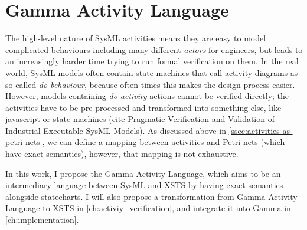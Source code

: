 \chapter{Gamma Activity Language}

The high-level nature of SysML activities means they are easy to model complicated behaviours including many different \emph{actors} for engineers, but leads to an increasingly harder time trying to run formal verification on them. In the real world, SysML models often contain state machines that call activity diagrams as so called \emph{do behaviour}, because often times this makes the design process easier. However, models containing \emph{do activity} actions cannot be verified directly; the activities have to be pre-processed and transformed into something else, like javascript or state machines (cite Pragmatic Verification and Validation of Industrial Executable SysML Models). As discussed above in \autoref{ssec:activities-as-petri-nets}, we can define a mapping between activities and Petri nets (which have exact semantics), however, that mapping is not exhaustive.

In this work, I propose the Gamma Activity Language, which aims to be an intermediary language between SysML and XSTS by having exact semantics alongside statecharts. I will also propose a transformation from Gamma Activity Language to XSTS in \autoref{ch:activiy_verification}, and integrate it into Gamma in \autoref{ch:implementation}.





